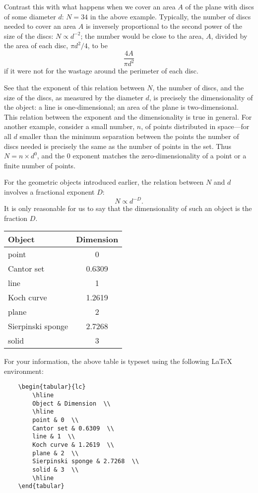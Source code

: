 \documentclass[12pt,a5paper]{article}
\begin{document}
Contrast this with what happens when we cover an area $A$ of the plane 
with discs of some diameter $d$: 
\(
	N=34
\)
 in the above example.  Typically, 
the number of discs needed to cover an area 
\(
	A
\)
is inversely proportional to the second power of the size of the 
discs: $N\propto d^{-2}$; the number would be close to the area, 
$A$, divided by the area of each disc, $\pi d^2/4$, to be  
\[
	\frac{4A}{\pi d^2}
\]
if it were not for the wastage around the perimeter of 
each disc.

See that the exponent of this relation between $N$, the number of 
discs, and the size of the discs, as measured by the diameter $d$, 
is precisely the dimensionality of the object: a line is 
one-dimensional; an area of the plane is two-dimensional.  This 
relation between the exponent and the dimensionality is true in 
general.  For another example, consider a small number, $n$, of 
points distributed in space---for all
\(
	d
\)
smaller than the minimum separation between the points the number of 
discs needed is precisely the same as the number of points in the set.  
Thus $N=n\times d^0$, and the 0 exponent matches the zero-dimensionality 
of a point or a finite number of points.

For the geometric objects introduced earlier, the relation between $
N$ and $d$ involves a fractional exponent $D$:
\begin{equation}
	N\propto d^{-D}.
\end{equation}
It is only reasonable for us to say that the 
dimensionality of such an object is the fraction $D$.
\begin{center}
	\begin{tabular}{lc}
		\hline
		Object & Dimension  \\
		\hline
		point & 0  \\
		Cantor set & 0.6309  \\
		line & 1  \\
		Koch curve & 1.2619  \\
		plane & 2  \\
		Sierpinski sponge & 2.7268  \\
		solid & 3  \\
		\hline
	\end{tabular}
\end{center}
For your information, the above table is typeset using the following 
LaTeX environment:
\begin{verbatim}
	\begin{tabular}{lc}
		\hline
		Object & Dimension  \\
		\hline
		point & 0  \\
		Cantor set & 0.6309  \\
		line & 1  \\
		Koch curve & 1.2619  \\
		plane & 2  \\
		Sierpinski sponge & 2.7268  \\
		solid & 3  \\
		\hline
	\end{tabular}
\end{verbatim}
\end{document}
